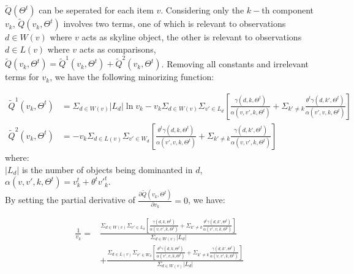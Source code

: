 \documentclass{article}
\begin{document}
 $\tilde{Q}(\Theta^t)$ can be seperated for each item $v$. Considering only the $k-$th component $v_k$, $\tilde{Q}(v_k,\Theta^t)$ involves two terms, one of which is relevant to observations $d\in W(v)$ where $v$ acts as skyline object, the other is relevant to observations $d \in L(v)$ where $v$ acts as comparisons, $\tilde{Q}(v_k,\Theta^t)=\tilde{Q}^1(v_k,\Theta^t)+\tilde{Q}^2(v_k,\Theta^t)$. Removing all constants and irrelevant terms for $v_k$, we have the following minorizing function:


\begin{equation}
\begin{aligned}
\tilde{Q}^1(v_k,\Theta^t) & = \Sigma_{d\in W(v)} |L_d| \ln v_k -v_k\Sigma_{d\in W(v)}\Sigma_{v'\in L_d} [\frac{\gamma(d,k,\Theta^t)}{ \alpha(v,v',k,\Theta^t)} +\Sigma_{k'\neq k}\frac{\theta^t\gamma(d,k',\Theta^t)}{\alpha(v',v,k,\Theta^t)}]\\ \nonumber
\tilde{Q}^2(v_k,\Theta^t) & = -v_k \Sigma_{d\in L(v)}\Sigma_{v'\in W_d} [\frac{\theta^t \gamma(d,k,\Theta^t)}{\alpha(v',v,k,\Theta^t)}+\Sigma_{k'\neq k} \frac{\gamma(d,k',\Theta^t)}{\alpha(v,v',k,\Theta^t)}]
\end{aligned}
\end{equation}
 where:\\

 $|L_d|$ is the number of objects being dominanted in $d$,
 \\ $\alpha(v,v',k,\Theta^t)=v_k^t + \theta^t {v'}_k^t$.
 \\
By setting the partial derivative of $\frac{\partial \tilde{Q}(v_k,\Theta^t)}{\partial v_k}=0$, we have:



\begin{equation}
\begin{aligned}
\frac{1}{v_k}= &\frac{\Sigma_{d\in W(v)}\Sigma_{v'\in L_d} [\frac{\gamma(d,k,\Theta^t)}{ \alpha(v,v',k,\Theta^t)} +\Sigma_{k'\neq k}\frac{\theta^t\gamma(d,k',\Theta^t)}{\alpha(v',v,k,\Theta^t)}]}{\Sigma_{d\in W(v)}|L_d|}\\\nonumber
 & + \frac{\Sigma_{d\in L(v)}\Sigma_{v'\in W_d} [\frac{\theta^t \gamma(d,k,\Theta^t)}{\alpha(v',v,k,\Theta^t)}+\Sigma_{k'\neq k} \frac{\gamma(d,k',\Theta^t)}{\alpha(v,v',k,\Theta^t)}] }{\Sigma_{d\in W(v)}|L_d|}
\end{aligned}
\end{equation}\\
\end{document}
